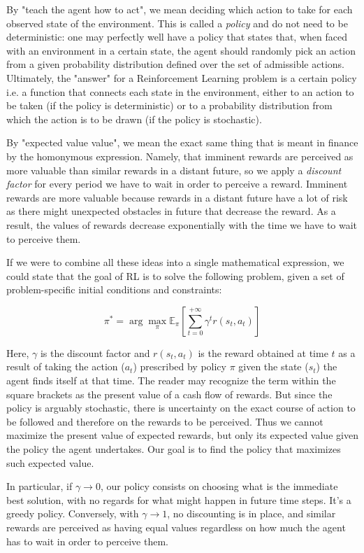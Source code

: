 \documentclass{article}
\begin{document}
By "teach the agent how to act", we mean deciding which action to take for each observed state of the environment. This is called a \emph{policy} and do not need to be deterministic: one may perfectly well have a policy that states that, when faced with an environment in a certain state, the agent should randomly pick an action from a given probability distribution defined over the set of admissible actions. Ultimately, the "answer" for a Reinforcement Learning problem is a certain policy i.e. a function that connects each state in the environment, either to an action to be taken (if the policy is deterministic) or to a probability distribution from which the action is to be drawn (if the policy is stochastic).

By "expected value value", we mean the exact same thing that is meant in finance by the homonymous expression. Namely, that imminent rewards are perceived as more valuable than similar rewards in a distant future, so we apply a \emph{discount factor} for every period we have to wait in order to perceive a reward. Imminent rewards are more valuable because rewards in a distant future have a lot of risk as there might unexpected obstacles in future that decrease the reward. As a result, the values of rewards decrease exponentially with the time we have to wait to perceive them.

If we were to combine all these ideas into a single mathematical expression, we could state that the goal of RL is to solve the following problem, given a set of problem-specific initial conditions and constraints:

$$
\pi^*=\arg \max_{\pi} \mathbb{E}_\pi \left[ \sum_{t=0}^{+\infty} \gamma^t r(s_t,a_t) \right ] \label{1}
$$

Here, $\gamma$ is the discount factor and  $r(s_t,a_t)$ is the reward obtained at time $t$ as a result of taking the action ($a_t$)  prescribed by policy $\pi$ given the state ($s_t$) the agent finds itself at that time. The reader may recognize the term within the square brackets as the present value of a cash flow of rewards. But since the policy is arguably stochastic, there is uncertainty on the exact course of action to be followed and therefore on the rewards to be perceived. Thus we cannot maximize the present value of expected rewards, but only its expected value given the policy the agent undertakes. Our goal is to find the policy that maximizes such expected value.

In particular, if $\gamma \to 0$, our policy consists on choosing what is the immediate best solution, with no regards for what might happen in future time steps. It's a greedy policy. Conversely, with $\gamma\to1$, no discounting is in place, and similar rewards are perceived as having equal values regardless on how much the agent has to wait in order to perceive them.
\end{document}
